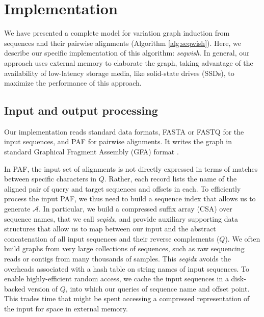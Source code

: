 \documentclass{bioinfo}
\theoremstyle{definition}
\begin{document}
\section{Implementation}

We have presented a complete model for variation graph induction from sequences and their pairwise alignments (Algorithm \ref{alg:seqwish}).
Here, we describe our specific implementation of this algorithm: \textit{seqwish}.
In general, our approach uses external memory to elaborate the graph, taking advantage of the availability of low-latency storage media, like solid-state drives (SSDs), to maximize the performance of this approach.

\subsection{Input and output processing}

Our implementation reads standard data formats, FASTA or FASTQ for the input sequences, and PAF \citep{Li_2018} for pairwise alignments.
It writes the graph in standard Graphical Fragment Assembly (GFA) format \citep{GFA}.

In PAF, the input set of alignments is not directly expressed in terms of matches between specific characters in $Q$.
Rather, each record lists the name of the aligned pair of query and target sequences and offsets in each.
To efficiently process the input PAF, we thus need to build a sequence index that allows us to generate $\mathcal{A}$.
In particular, we build a compressed suffix array (CSA) \citep{Sadakane_2000} over sequence names, that we call \textit{seqidx}, and provide auxiliary supporting data structures that allow us to map between our input and the abstract concatenation of all input sequences and their reverse complements ($Q$).
We often build graphs from very large collections of sequences, such as raw sequencing reads or contigs from many thousands of samples.
This \textit{seqidx} avoids the overheads associated with a hash table on string names of input sequences.
To enable highly-efficient random access, we cache the input sequences in a disk-backed version of $Q$, into which our queries of sequence name and offset point.
This trades time that might be spent accessing a compressed representation of the input for space in external memory.
\end{document}

